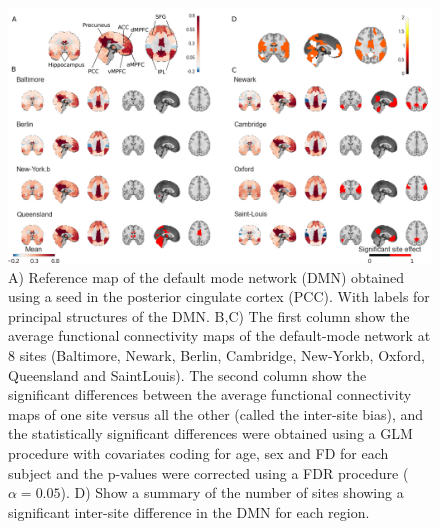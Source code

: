 \documentclass[authoryear]{elsarticle}
\begin{document}
\begin{figure}[tbp]
\begin{center}
\includegraphics[width=\linewidth]{../figures/dmn_multisite.png}
\end{center}
\caption[DMN variability across sites]{
A) Reference map of the default mode network (DMN) obtained using a seed in the posterior cingulate cortex (PCC). With labels for principal structures of the DMN.
B,C) The first column show the average functional connectivity maps of the default-mode network at 8 sites (Baltimore, Newark, Berlin, Cambridge, New-Yorkb, Oxford, Queensland and SaintLouis). The second column show the significant differences between the average functional connectivity maps of one site versus all the other (called the inter-site bias), and the statistically significant differences were obtained using a GLM procedure with covariates coding for age, sex and FD for each subject and the p-values were corrected using a FDR procedure ($\alpha=0.05$).
D) Show a summary of the number of sites showing a significant inter-site difference in the DMN for each region.
}
\label{fig_DMN_variability}
\end{figure}
\end{document}
